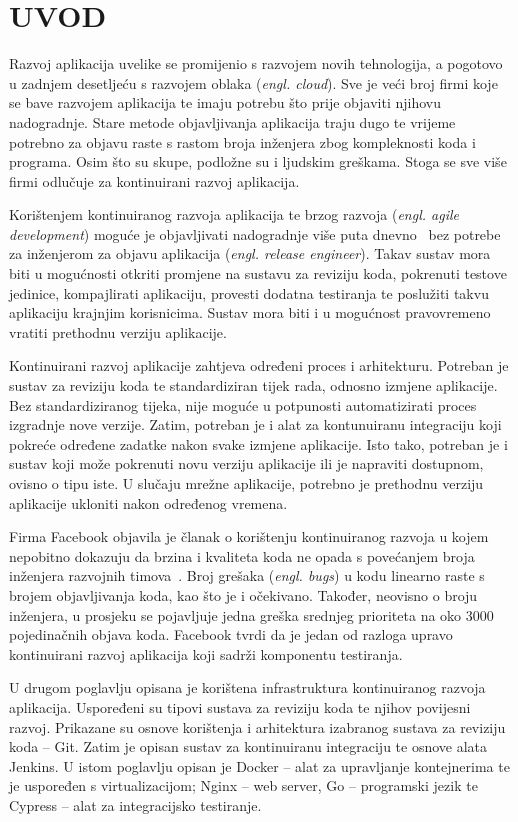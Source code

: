 \chapter{UVOD}
Razvoj aplikacija uvelike se promijenio s razvojem novih tehnologija, a pogotovo u zadnjem
desetljeću s razvojem oblaka (\textit{engl. cloud}). Sve je veći broj firmi koje se bave razvojem
aplikacija te imaju potrebu što prije objaviti njihovu nadogradnje. Stare metode objavljivanja
aplikacija traju dugo te vrijeme potrebno za objavu raste s rastom broja inženjera zbog kompleknosti
koda i programa. Osim što su skupe, podložne su i ljudskim greškama. Stoga se sve više firmi
odlučuje za kontinuirani razvoj aplikacija.

Korištenjem kontinuiranog razvoja aplikacija te brzog razvoja (\textit{engl. agile development})
moguće je objavljivati nadogradnje više puta dnevno~\citep{abrahamsson2017agile} bez potrebe za
inženjerom za objavu aplikacija (\textit{engl. release engineer}). Takav sustav mora biti u
mogućnosti otkriti promjene na sustavu za reviziju koda, pokrenuti testove jedinice, kompajlirati
aplikaciju, provesti dodatna testiranja te poslužiti takvu aplikaciju krajnjim korisnicima. Sustav
mora biti i u mogućnost pravovremeno vratiti prethodnu verziju aplikacije.

Kontinuirani razvoj aplikacije zahtjeva određeni proces i arhitekturu. Potreban je sustav za
reviziju koda te standardiziran tijek rada, odnosno izmjene aplikacije. Bez standardiziranog tijeka,
nije moguće u potpunosti automatizirati proces izgradnje nove verzije. Zatim, potreban je i alat za
kontunuiranu integraciju koji pokreće određene zadatke nakon svake izmjene aplikacije. Isto tako,
potreban je i sustav koji može pokrenuti novu verziju aplikacije ili je napraviti dostupnom, ovisno
o tipu iste. U slučaju mrežne aplikacije, potrebno je prethodnu verziju aplikacije ukloniti nakon
određenog vremena.

Firma Facebook objavila je članak o korištenju kontinuiranog razvoja u kojem nepobitno dokazuju da
brzina i kvaliteta koda ne opada s povećanjem broja inženjera razvojnih
timova~\citep{rossi2016continuous}. Broj grešaka (\textit{engl. bugs}) u kodu linearno raste s
brojem objavljivanja koda, kao što je i očekivano. Također, neovisno o broju inženjera, u prosjeku
se pojavljuje jedna greška srednjeg prioriteta na oko 3000 pojedinačnih objava koda. Facebook tvrdi
da je jedan od razloga upravo kontinuirani razvoj aplikacija koji sadrži komponentu testiranja.

U drugom poglavlju opisana je korištena infrastruktura kontinuiranog razvoja aplikacija. Uspoređeni
su tipovi sustava za reviziju koda te njihov povijesni razvoj. Prikazane su osnove korištenja i
arhitektura izabranog sustava za reviziju koda -- Git. Zatim je opisan sustav za kontinuiranu
integraciju te osnove alata Jenkins. U istom poglavlju opisan je Docker -- alat za upravljanje
kontejnerima te je uspoređen s virtualizacijom; Nginx -- web server, Go -- programski jezik te
Cypress -- alat za integracijsko testiranje.

